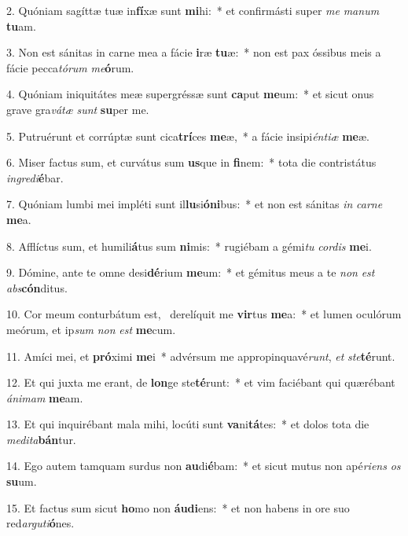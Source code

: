 2. Quóniam sagíttæ tuæ in\textbf{fí}xæ sunt \textbf{mi}hi:~*  et confirmásti super \textit{me} \textit{ma}\textit{num} \textbf{tu}am.\

3. Non est sánitas in carne mea a fácie \textbf{i}ræ \textbf{tu}æ:~*  non est pax óssibus meis a fácie pecca\textit{tó}\textit{rum} \textit{me}\textbf{ó}rum.\

4. Quóniam iniquitátes meæ supergréssæ sunt \textbf{ca}put \textbf{me}um:~*  et sicut onus grave gra\textit{vá}\textit{tæ} \textit{sunt} \textbf{su}per me.\

5. Putruérunt et corrúptæ sunt cica\textbf{trí}ces \textbf{me}æ,~*  a fácie insipi\textit{én}\textit{ti}\textit{æ} \textbf{me}æ.\

6. Miser factus sum, et curvátus sum \textbf{us}que in \textbf{fi}nem:~*  tota die contristátus \textit{in}\textit{gre}\textit{di}\textbf{é}bar.\

7. Quóniam lumbi mei impléti sunt il\textbf{lu}si\textbf{ó}\textbf{ni}bus:~*  et non est sánitas \textit{in} \textit{car}\textit{ne} \textbf{me}a.\

8. Afflíctus sum, et humili\textbf{á}tus sum \textbf{ni}mis:~*  rugiébam a gémi\textit{tu} \textit{cor}\textit{dis} \textbf{me}i.\

9. Dómine, ante te omne desi\textbf{dé}rium \textbf{me}um:~*  et gémitus meus a te \textit{non} \textit{est} \textit{abs}\textbf{cón}ditus.\

10. Cor meum conturbátum est, \dag\  derelíquit me \textbf{vir}tus \textbf{me}a:~*  et lumen oculórum meórum, et ip\textit{sum} \textit{non} \textit{est} \textbf{me}cum.\

11. Amíci mei, et \textbf{pró}ximi \textbf{me}i~*  advérsum me appropinquavé\textit{runt}, \textit{et} \textit{ste}\textbf{té}runt.\

12. Et qui juxta me erant, de \textbf{lon}ge ste\textbf{té}runt:~*  et vim faciébant qui quærébant \textit{á}\textit{ni}\textit{mam} \textbf{me}am.\

13. Et qui inquirébant mala mihi, locúti sunt \textbf{va}ni\textbf{tá}tes:~*  et dolos tota die \textit{me}\textit{di}\textit{ta}\textbf{bán}tur.\

14. Ego autem tamquam surdus non \textbf{au}di\textbf{é}bam:~*  et sicut mutus non apé\textit{ri}\textit{ens} \textit{os} \textbf{su}um.\

15. Et factus sum sicut \textbf{ho}mo non \textbf{áu}\textbf{di}ens:~*  et non habens in ore suo red\textit{ar}\textit{gu}\textit{ti}\textbf{ó}nes.\

